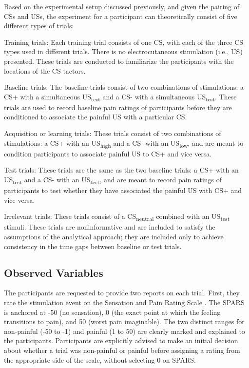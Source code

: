\documentclass{article}
\begin{document}
Based on the experimental setup discussed previously, and given the pairing of CSs and USs, the experiment for a participant can theoretically consist of five different types of trials:

Training trials: Each training trial consists of one CS, with each of the three CS types used in different trials. There is no electrocutaneous stimulation (i.e., US) presented. These trials are conducted to familiarize the participants with the locations of the CS tactors. 

Baseline trials: The baseline trials consist of two combinations of stimulations: a CS+ with a simultaneous US\textsubscript{test} and a CS- with a simultaneous US\textsubscript{test}. These trials are used to record baseline pain ratings of participants before they are conditioned to associate the painful US with a particular CS.

Acquisition or learning trials: These trials consist of two combinations of stimulations: a CS+ with an US\textsubscript{high} and a CS- with an US\textsubscript{low}, and are meant to condition participants to associate painful US to CS+ and vice versa.

Test trials: These trials are the same as the two baseline trials: a CS+ with an US\textsubscript{test} and a CS- with an US\textsubscript{test}, and are meant to record pain ratings of participants to test whether they have associated the painful US with CS+ and vice versa.

Irrelevant trials: These trials consist of a CS\textsubscript{neutral} combined with an US\textsubscript{test} stimuli. These trials are noninformative and are included to satisfy the assumptions of the analytical approach; they are included only to achieve consistency in the time gaps between baseline or test trials. 

\subsection{Observed Variables}

The participants are requested to provide two reports on each trial. First, they rate the stimulation event on the Sensation and Pain Rating Scale \parencite[][SPARS; previously known as FESTNRS;]{Madden2017}\parencite{Madden2019}. The SPARS is anchored at -50 (no sensation), 0 (the exact point at which the feeling transitions to pain), and 50 (worst pain imaginable). The two distinct ranges for non-painful (-50 to -1) and painful (1 to 50) are clearly marked and explained to the participants. Participants are explicitly advised to make an initial decision about whether a trial was non-painful or painful before assigning a rating from the appropriate side of the scale, without selecting 0 on SPARS. 
\end{document}
